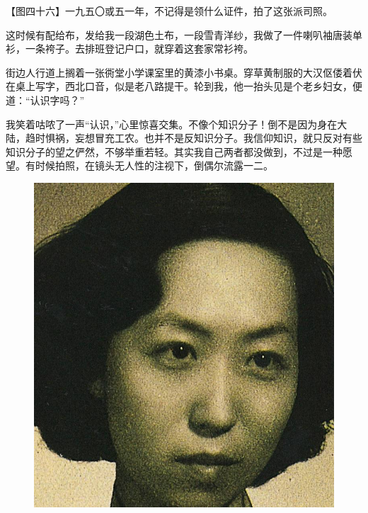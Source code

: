\clearpage
\par 【图四十六】一九五〇或五一年，不记得是领什么证件，拍了这张派司照。
\par 这时候有配给布，发给我一段湖色土布，一段雪青洋纱，我做了一件喇叭袖唐装单衫，一条袴子。去排班登记户口，就穿着这套家常衫袴。
\par 街边人行道上搁着一张衖堂小学课室里的黄漆小书桌。穿草黄制服的大汉伛偻着伏在桌上写字，西北口音，似是老八路提干。轮到我，他一抬头见是个老乡妇女，便道：“认识字吗？”
\par 我笑着咕哝了一声“认识，”心里惊喜交集。不像个知识分子！倒不是因为身在大陆，趋时惧祸，妄想冒充工农。也并不是反知识分子。我信仰知识，就只反对有些知识分子的望之俨然，不够举重若轻。其实我自己两者都没做到，不过是一种愿望。有时候拍照，在镜头无人性的注视下，倒偶尔流露一二。
\begin{figure}[htb]
    \centering %
    \includegraphics[scale=0.4]{picture/对照记46.jpeg}
\end{figure}


